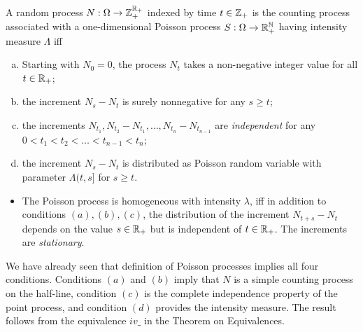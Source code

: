 \documentclass[12pt,aspectratio=169]{beamer}
\begin{document}
\begin{frame}
\begin{cor}
A random process $N: \Omega \to \mathbb{Z}_+^{\mathbb{R}_+}$ indexed by time $t \in \mathbb{Z}_+$ is the counting process associated with a one-dimensional Poisson process $S: \Omega \to \mathbb{R}_+^{\mathbb{N}}$ having intensity measure $\Lambda$ iff
\begin{enumerate}[(a)]
\item<2-> Starting with $N_0 = 0$, the process $N_t$ takes a non-negative integer value for all $t \in \mathbb{R}_+$;
\item<3-> the increment $N_s - N_t$ is surely nonnegative for any $s \ge t$;
\item<4-> the increments $N_{t_1}, N_{t_2} - N_{t_1},  \dots , N_{t_n} - N_{t_{n-1}}$ are \textit{independent} for any 
$0 < t_1 < t_2 < \dots < t_{n-1} < t_n$; 
\item<5-> the increment $N_s - N_t$ is distributed as Poisson random variable with parameter $\Lambda(t, s]$ for $s \ge t$.  
\end{enumerate}
\end{cor}
\begin{itemize}
\item<6-> The Poisson process is homogeneous with intensity $\lambda$, iff in addition to conditions $(a), (b), (c)$, 
the distribution of the increment $N_{t+s} - N_t$ depends on the value $s \in \mathbb{R}_+$ but is independent of $t \in \mathbb{R}_+$. The increments are \textit{stationary}. 
\end{itemize}
\end{frame}

\begin{frame}
\begin{Proof} 
We have already seen that definition of Poisson processes implies all four conditions. 
Conditions $(a)$ and $(b)$ imply that $N$ is a simple counting process on the half-line, 
condition $(c)$ is the complete independence property of the point process, 
and condition $(d)$ provides the intensity measure. 
The result follows from the equivalence $iv\_$ in the Theorem on Equivalences. 
\end{Proof}
\end{frame}



\end{document}
